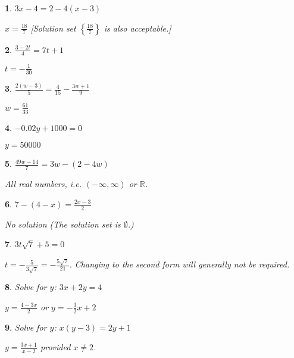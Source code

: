 \documentclass{amsbook}
\newtheorem{exc}{}
\newenvironment{ex}{\begin{exc}\normalfont}{\end{exc}}
\numberwithin{section}{chapter}
\numberwithin{equation}{chapter}
\newcommand{\ds}{\displaystyle}
\newcommand{\R}{\mathbb{R}}
\begin{document}
\begin{multicols}{2}
	\begin{ex}
		$\ds{3x-4=2-4(x-3)}$
		\begin{sol}
			$x=\frac{18}{7}$ [Solution set $\left\{\frac{18}{7}\right\}$ is also acceptable.]
		\end{sol}
	\end{ex}
	\begin{ex}
	$\ds{\frac{3-2t}{4} = 7t+1}$
	\begin{sol}
		$t=-\frac{1}{30}$
	\end{sol}
\end{ex}
	\begin{ex}
	$\ds{\frac{2(w-3)}{5} = \frac{4}{15}-\frac{3w+1}{9}}$
	\begin{sol}
		$w=\frac{61}{33}$
	\end{sol}
\end{ex}
	\begin{ex}
	$\ds{-0.02y+1000=0}$
	\begin{sol}
		$y=50000$
	\end{sol}
\end{ex}
	\begin{ex}
	$\ds{ \frac{49w-14}{7} =3w-(2-4w)   }$
	\begin{sol}
		All real numbers, i.e. $(-\infty,\infty)$ or $\R$.
	\end{sol}
\end{ex}
	\begin{ex}
	$\ds{ 7-(4-x) = \frac{2x-3}{2}   }$
	\begin{sol}
		No solution (The solution set is $\emptyset$.)
	\end{sol}
\end{ex}
	\begin{ex}
	$\ds{ 3t\sqrt{7}+5=0 }$
	\begin{sol}
		$t=-\frac{5}{3\sqrt{7}} = -\frac{5\sqrt{7}}{21}$. Changing to the second form will generally \textit{not be required}.
	\end{sol}
\end{ex}
\end{multicols}

\begin{ex}
	Solve for $y$: $3x+2y=4$
	\begin{sol}
		$y=\frac{4-3x}{2}$ or $y=-\frac{3}{2}x+2$
	\end{sol}
\end{ex}

\begin{ex}
	Solve for $y$: $x(y-3) = 2y+1$
	\begin{sol}
		$y=\frac{3x+1}{x-2}$ provided $x\neq 2$.
	\end{sol}
\end{ex}
\end{document}
